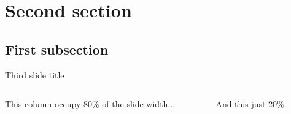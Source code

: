 \section{Second section}
\subsection{First subsection}

\begin{frame}{Third slide title}
	\begin{columns}
		\begin{column}{0.8\textwidth}
			This column occupy 80\% of the slide width...
			\pause
		\end{column}
		\begin{column}{0.2\textwidth}
			And this just 20\%.
		\end{column}
	\end{columns}
\end{frame}
